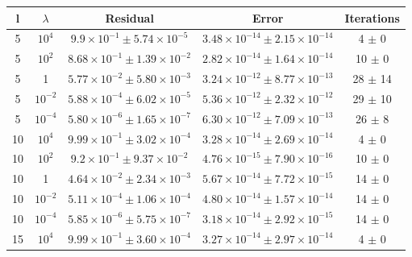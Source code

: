 \begin{table}[H]
\centering
\begin{tabular}{c|c|c|c|c}
\hline \hline
l & $\lambda$ & Residual & Error & Iterations \\ \hline \hline

\rowcolor{gray!30} 5 & $10^4$ & $9.9 \times 10^{-1} \pm 5.74 \times 10^{-5}$ & $3.48 \times 10^{-14} \pm 2.15 \times 10^{-14}$ & 4 $\pm$ 0 \\ \hline

5 & $10^2$ & $8.68 \times 10^{-1} \pm 1.39 \times 10^{-2}$ & $2.82 \times 10^{-14} \pm 1.64 \times 10^{-14}$ & 10 $\pm$ 0 \\ \hline

\rowcolor{gray!30} 5 & 1 & $5.77 \times 10^{-2} \pm 5.80 \times 10^{-3}$ & $3.24 \times 10^{-12} \pm 8.77 \times 10^{-13}$ & 28 $\pm$ 14 \\ \hline

5 & $10^{-2}$ & $5.88 \times 10^{-4} \pm 6.02 \times 10^{-5}$ & $5.36 \times 10^{-12} \pm 2.32 \times 10^{-12}$ & 29 $\pm$ 10 \\ \hline

\rowcolor{gray!30} 5 & $10^{-4}$ & $5.80 \times 10^{-6} \pm 1.65 \times 10^{-7}$ & $6.30 \times 10^{-12} \pm 7.09 \times 10^{-13}$ & 26 $\pm$ 8 \\ \hline

10 & $10^4$ & $9.99 \times 10^{-1} \pm 3.02 \times 10^{-4}$ & $3.28 \times 10^{-14} \pm 2.69 \times 10^{-14}$ & 4 $\pm$ 0 \\ \hline

\rowcolor{gray!30} 10 & $10^2$ & $9.2 \times 10^{-1} \pm 9.37 \times 10^{-2}$ & $4.76 \times 10^{-15} \pm 7.90 \times 10^{-16}$ & 10 $\pm$ 0 \\ \hline

10 & 1 & $4.64 \times 10^{-2} \pm 2.34 \times 10^{-3}$ & $5.67 \times 10^{-14} \pm 7.72 \times 10^{-15}$ & 14 $\pm$ 0 \\ \hline

\rowcolor{gray!30} 10 & $10^{-2}$ & $5.11 \times 10^{-4} \pm 1.06 \times 10^{-4}$ & $4.80 \times 10^{-14} \pm 1.57 \times 10^{-14}$ & 14 $\pm$ 0 \\ \hline

10 & $10^{-4}$ & $5.85 \times 10^{-6} \pm 5.75 \times 10^{-7}$ & $3.18 \times 10^{-14} \pm 2.92 \times 10^{-15}$ & 14 $\pm$ 0 \\ \hline

\rowcolor{gray!30} 15 & $10^4$ & $9.99 \times 10^{-1} \pm 3.60 \times 10^{-4}$ & $3.27 \times 10^{-14} \pm 2.97 \times 10^{-14}$ & 4 $\pm$ 0 \\ \hline


\end{tabular}
\end{table}
